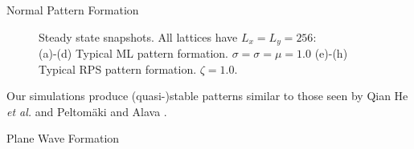 \documentclass{beamer}
\begin{document}
\begin{frame}{}
\begin{textblock}{0.32}
\begin{block}{\centering Normal Pattern Formation}
\begin{figure}[h]
            \caption{\centering Steady state snapshots. All lattices have $L_x = L_y = 256$: \\ 
            (a)-(d) Typical ML pattern formation. $\sigma = \sigma = \mu = 1.0$  (e)-(h) Typical RPS pattern formation. $\zeta = 1.0$.}
            \label{fig:patterns}
        \end{figure}
        Our simulations produce (quasi-)stable patterns similar to those seen by Qian He \textit{et al.} \cite{he2011} and Peltom{\"a}ki and Alava \cite{peltomaki08}.

    \end{block}
    \begin{block}{\centering Plane Wave Formation}
        \begin{figure}[h]
            \centering
            \\

\end{figure}
\end{block}
\end{textblock}
\end{frame}
\end{document}
